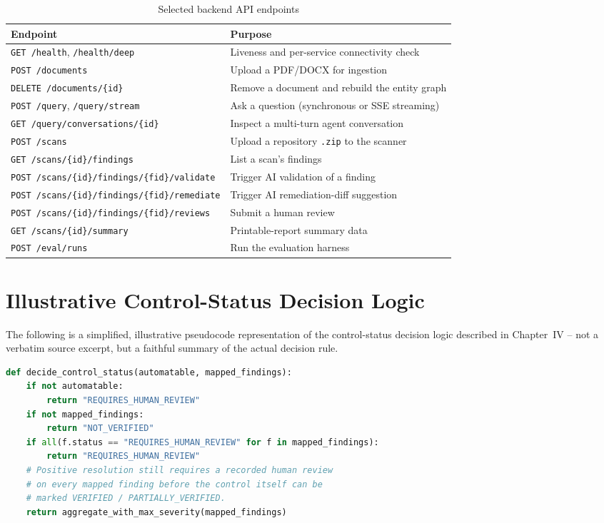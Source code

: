 \documentclass[12pt,a4paper]{report}
\begin{document}
\begin{table}[H]
\centering
\caption{Selected backend API endpoints}
\label{tab:endpoints}
\begin{tabularx}{\textwidth}{@{}l X@{}}
\toprule
\textbf{Endpoint} & \textbf{Purpose} \\
\midrule
\texttt{GET /health}, \texttt{/health/deep} & Liveness and per-service connectivity check \\
\texttt{POST /documents} & Upload a \ac{PDF}/DOCX for ingestion \\
\texttt{DELETE /documents/\{id\}} & Remove a document and rebuild the entity graph \\
\texttt{POST /query}, \texttt{/query/stream} & Ask a question (synchronous or \ac{SSE} streaming) \\
\texttt{GET /query/conversations/\{id\}} & Inspect a multi-turn agent conversation \\
\texttt{POST /scans} & Upload a repository \texttt{.zip} to the scanner \\
\texttt{GET /scans/\{id\}/findings} & List a scan's findings \\
\texttt{POST /scans/\{id\}/findings/\{fid\}/validate} & Trigger AI validation of a finding \\
\texttt{POST /scans/\{id\}/findings/\{fid\}/remediate} & Trigger AI remediation-diff suggestion \\
\texttt{POST /scans/\{id\}/findings/\{fid\}/reviews} & Submit a human review \\
\texttt{GET /scans/\{id\}/summary} & Printable-report summary data \\
\texttt{POST /eval/runs} & Run the evaluation harness \\
\bottomrule
\end{tabularx}
\end{table}

\chapter{Illustrative Control-Status Decision Logic}

The following is a simplified, illustrative pseudocode representation of
the control-status decision logic described in Chapter~IV -- not a verbatim
source excerpt, but a faithful summary of the actual decision rule.

\begin{lstlisting}[language=Python, caption={Illustrative control-status decision logic}]
def decide_control_status(automatable, mapped_findings):
    if not automatable:
        return "REQUIRES_HUMAN_REVIEW"
    if not mapped_findings:
        return "NOT_VERIFIED"
    if all(f.status == "REQUIRES_HUMAN_REVIEW" for f in mapped_findings):
        return "REQUIRES_HUMAN_REVIEW"
    # Positive resolution still requires a recorded human review
    # on every mapped finding before the control itself can be
    # marked VERIFIED / PARTIALLY_VERIFIED.
    return aggregate_with_max_severity(mapped_findings)
\end{lstlisting}
\end{document}
